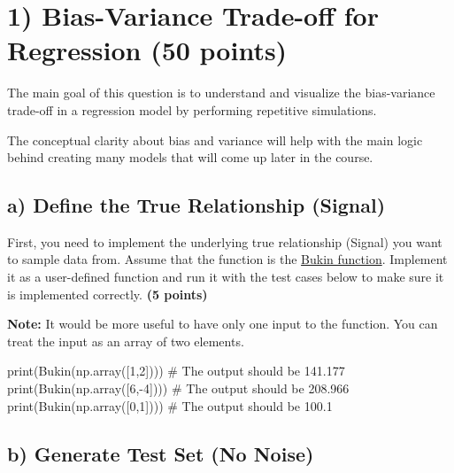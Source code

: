 \documentclass[
  letterpaper,
  DIV=11,
  numbers=noendperiod]{scrreprt}
\newenvironment{Shaded}{\begin{snugshade}}{\end{snugshade}}
\newcommand{\BuiltInTok}[1]{\textcolor[rgb]{0.00,0.23,0.31}{#1}}
\newcommand{\CommentTok}[1]{\textcolor[rgb]{0.37,0.37,0.37}{#1}}
\newcommand{\DecValTok}[1]{\textcolor[rgb]{0.68,0.00,0.00}{#1}}
\newcommand{\NormalTok}[1]{\textcolor[rgb]{0.00,0.23,0.31}{#1}}
\newcommand{\OperatorTok}[1]{\textcolor[rgb]{0.37,0.37,0.37}{#1}}
\begin{document}
\section{\texorpdfstring{1) Bias-Variance Trade-off for Regression
\textbf{(50
points)}}{1) Bias-Variance Trade-off for Regression (50 points)}}\label{bias-variance-trade-off-for-regression-50-points}

The main goal of this question is to understand and visualize the
bias-variance trade-off in a regression model by performing repetitive
simulations.

The conceptual clarity about bias and variance will help with the main
logic behind creating many models that will come up later in the course.

\subsection{a) Define the True Relationship
(Signal)}\label{a-define-the-true-relationship-signal}

First, you need to implement the underlying true relationship (Signal)
you want to sample data from. Assume that the function is the
\href{https://www.sfu.ca/~ssurjano/bukin6.html}{Bukin function}.
Implement it as a user-defined function and run it with the test cases
below to make sure it is implemented correctly. \textbf{(5 points)}

\textbf{Note:} It would be more useful to have only one input to the
function. You can treat the input as an array of two elements.

\begin{Shaded}
\begin{Highlighting}[]
\BuiltInTok{print}\NormalTok{(Bukin(np.array([}\DecValTok{1}\NormalTok{,}\DecValTok{2}\NormalTok{]))) }\CommentTok{\# The output should be 141.177}
\BuiltInTok{print}\NormalTok{(Bukin(np.array([}\DecValTok{6}\NormalTok{,}\OperatorTok{{-}}\DecValTok{4}\NormalTok{]))) }\CommentTok{\# The output should be 208.966}
\BuiltInTok{print}\NormalTok{(Bukin(np.array([}\DecValTok{0}\NormalTok{,}\DecValTok{1}\NormalTok{]))) }\CommentTok{\# The output should be 100.1}
\end{Highlighting}
\end{Shaded}

\subsection{b) Generate Test Set (No
Noise)}\label{b-generate-test-set-no-noise}
\end{document}
